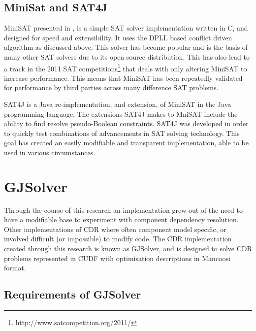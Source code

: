 \subsection{MiniSat and SAT4J}
MiniSAT presented in \cite{een2003}, is a simple SAT solver implementation written in C, and designed for speed and extensibility.
It uses the DPLL based conflict driven algorithm as discussed above.
This solver has become popular and is the basis of many other SAT solvers due to its open source distribution.
This has also lead to a track in the 2011 SAT competitions\footnote{http://www.satcompetition.org/2011/} that deals with only altering MiniSAT to increase performance.
This means that MiniSAT has been repeatedly validated for performance by third parties across many difference SAT problems. 

SAT4J \citep{le2010sat4j} is a Java re-implementation, and extension, of MiniSAT in the Java programming language.
The extensions SAT4J makes to MniSAT include the ability to find resolve pseudo-Boolean constraints.
SAT4J was developed in order to quickly test combinations of advancements in SAT solving technology.
This goal has created an easily modifiable and transparent implementation, able to be used in various circumstances.

\section{GJSolver}
Through the course of this research an implementation grew out of the need to have a modifiable base to experiment with component dependency resolution.
Other implementations of CDR where often component model specific, or involved difficult (or impossible) to modify code.
The CDR implementation created through this research is known as GJSolver, 
and is designed to solve CDR problems represented in CUDF with optimisation descriptions in Mancoosi format.

\subsection{Requirements of GJSolver}


